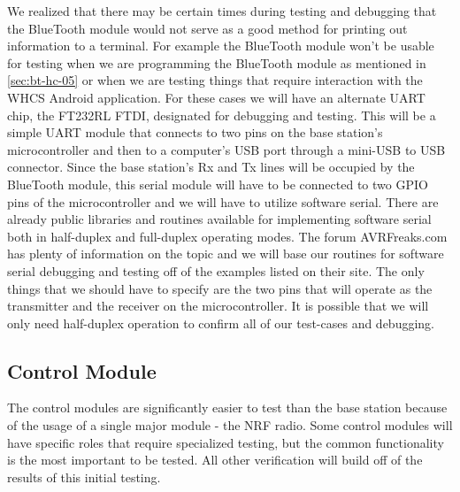 We realized that there may be certain times during testing and debugging that
the BlueTooth module would not serve as a good method for printing out
information to a terminal. For example the BlueTooth module won't be
usable for testing when we are programming the BlueTooth module as mentioned in
\autoref{sec:bt-hc-05} or when we are testing things that require interaction with the
WHCS Android application. For these cases we will have an alternate UART chip,
the FT232RL FTDI, designated for debugging and testing. This will be a simple
UART module that connects to two pins on the base station's
microcontroller and then to a computer's USB port through a mini-USB to
USB connector. Since the base station's Rx and Tx lines will be
occupied by the BlueTooth module, this serial module will have to be connected
to two GPIO pins of the microcontroller and we will have to utilize software
serial. There are already public libraries and routines available for
implementing software serial both in half-duplex and full-duplex operating
modes. The forum AVRFreaks.com has plenty of information on the topic and we
will base our routines for software serial debugging and testing off of the
examples listed on their site. The only things that we should have to specify
are the two pins that will operate as the transmitter and the receiver on the
microcontroller. It is possible that we will only need half-duplex operation to
confirm all of our test-cases and debugging.

\subsection{Control Module}
The control modules are significantly easier to test than the base station
because of the usage of a single major module - the NRF radio. Some control
modules will have specific roles that require specialized testing, but the
common functionality is the most important to be tested. All other verification
will build off of the results of this initial testing.


